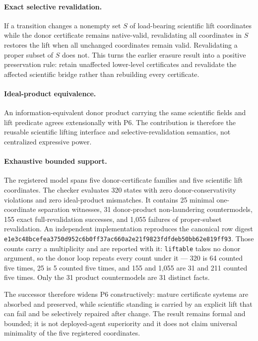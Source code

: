 \paragraph{Exact selective revalidation.}
If a transition changes a nonempty set $S$ of load-bearing scientific lift coordinates while the donor certificate remains native-valid, revalidating all coordinates in $S$ restores the lift when all unchanged coordinates remain valid. Revalidating a proper subset of $S$ does not. This turns the earlier erasure result into a positive preservation rule: retain unaffected lower-level certificates and revalidate the affected scientific bridge rather than rebuilding every certificate.

\paragraph{Ideal-product equivalence.}
An information-equivalent donor product carrying the same scientific fields and lift predicate agrees extensionally with P6. The contribution is therefore the reusable scientific lifting interface and selective-revalidation semantics, not centralized expressive power.

\paragraph{Exhaustive bounded support.}
The registered model spans five donor-certificate families and five scientific lift coordinates. The checker evaluates 320 states with zero donor-conservativity violations and zero ideal-product mismatches. It contains 25 minimal one-coordinate separation witnesses, 31 donor-product non-laundering countermodels, 155 exact full-revalidation successes, and 1,055 failures of proper-subset revalidation. An independent implementation reproduces the canonical row digest \texttt{e1e3c48bcefea3750d952c6b0ff37ac660a2e21f9823fdfdeb50bb62e819ff93}. Those counts carry a multiplicity and are reported with it: \texttt{liftable} takes no donor argument, so the donor loop repeats every count under it --- 320 is 64 counted five times, 25 is 5 counted five times, and 155 and 1,055 are 31 and 211 counted five times. Only the 31 product countermodels are 31 distinct facts.

The successor therefore widens P6 constructively: mature certificate systems are absorbed and preserved, while scientific standing is carried by an explicit lift that can fail and be selectively repaired after change. The result remains formal and bounded; it is not deployed-agent superiority and it does not claim universal minimality of the five registered coordinates.
